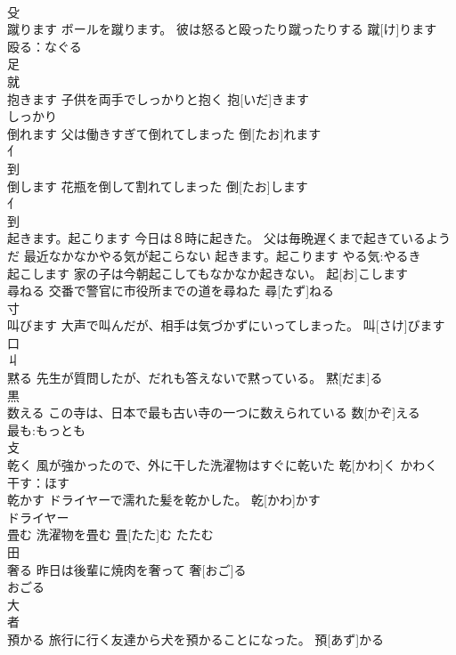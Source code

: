\documentclass[8pt]{extreport}
\begin{document}
\begin{CJK}{UTF8}{min}
\\	殳 
\\	蹴ります	ボールを蹴ります。 彼は怒ると殴ったり蹴ったりする	蹴[け]ります			
\\	殴る：なぐる
\\	足 
\\	就 
\\	抱きます	子供を両手でしっかりと抱く	抱[いだ]きます			
\\	しっかり　
\\	倒れます	父は働きすぎて倒れてしまった	倒[たお]れます			
\\	亻 
\\	到 
\\	倒します	花瓶を倒して割れてしまった	倒[たお]します			
\\	亻 
\\	到 
\\	起きます。起こります	今日は８時に起きた。 父は毎晩遅くまで起きているようだ 最近なかなかやる気が起こらない	起きます。起こります			やる気:やるき
\\	起こします	家の子は今朝起こしてもなかなか起きない。	起[お]こします			
\\	尋ねる	交番で警官に市役所までの道を尋ねた	尋[たず]ねる	
\\	寸 
\\	叫びます	大声で叫んだが、相手は気づかずにいってしまった。	叫[さけ]びます	
\\	口 
\\	丩	
\\	黙る	先生が質問したが、だれも答えないで黙っている。	黙[だま]る	
\\	黒 
\\	数える	この寺は、日本で最も古い寺の一つに数えられている	数[かぞ]える			
\\	最も:もっとも
\\	攴 
\\	乾く	風が強かったので、外に干した洗濯物はすぐに乾いた	乾[かわ]く			かわく
\\	干す：ほす
\\	乾かす	ドライヤーで濡れた髪を乾かした。	乾[かわ]かす			
\\	ドライヤー
\\	畳む	洗濯物を畳む	畳[たた]む			たたむ
\\	田 
\\	奢る	昨日は後輩に焼肉を奢って	奢[おご]る	
\\	おごる
\\	大 
\\	者 
\\	預かる	旅行に行く友達から犬を預かることになった。	預[あず]かる	

\end{CJK}
\end{document}
